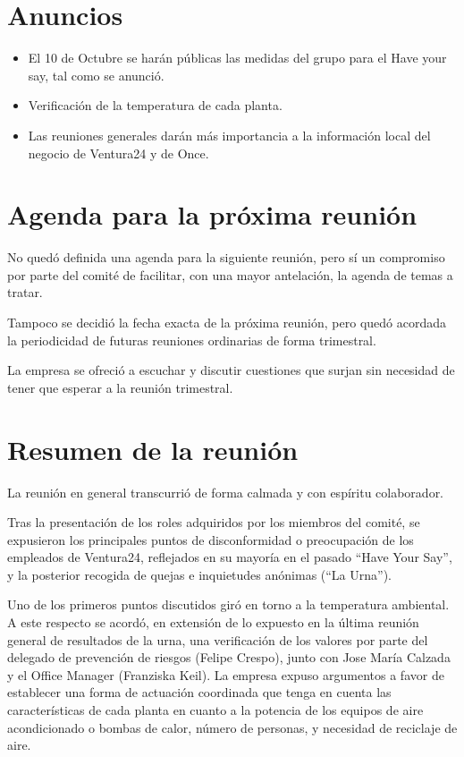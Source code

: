 \documentclass[11pt]{article}
\begin{document}
\section{Anuncios}
\label{sec-4}

\begin{itemize}
\item El 10 de Octubre se harán públicas las medidas del grupo para el Have your say, tal como se anunció.

\item Verificación de la temperatura de cada planta.

\item Las reuniones generales darán más importancia a la información local del negocio de Ventura24 y de Once.
\end{itemize}

\section{Agenda para la próxima reunión}
\label{sec-5}

No quedó definida una agenda para la siguiente reunión, pero sí un compromiso por parte del comité de facilitar, con una mayor antelación, la agenda de temas a tratar.

Tampoco se decidió la fecha exacta de la próxima reunión, pero quedó acordada la periodicidad de futuras reuniones ordinarias de forma trimestral.

La empresa se ofreció a escuchar y discutir cuestiones que surjan sin necesidad de tener que esperar a la reunión trimestral.

\section{Resumen de la reunión}
\label{sec-6}

La reunión en general transcurrió de forma calmada y con espíritu co\-la\-bo\-ra\-dor.

Tras la presentación de los roles adquiridos por los miembros del comité, se expusieron los principales puntos de disconformidad o preocupación de los empleados de Ventura24, reflejados en su mayoría en el pasado “Have Your Say”, y la posterior recogida de quejas e inquietudes anónimas (“La Urna”).

Uno de los primeros puntos discutidos giró en torno a la temperatura ambiental. A este respecto se acordó, en extensión de lo expuesto en la última reunión general de resultados de la urna, una verificación de los valores por parte del delegado de prevención de riesgos (Felipe Crespo), junto con Jose María Calzada y el Office Manager (Franziska Keil). La empresa expuso argumentos a favor de establecer una forma de actuación coordinada que tenga en cuenta las características de cada planta en cuanto a la potencia de los equipos de aire acondicionado o bombas de calor, número de personas, y necesidad de reciclaje de aire.
\end{document}
